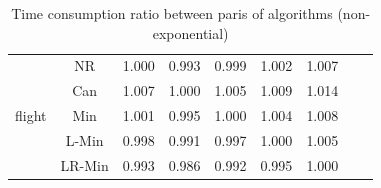 \documentclass[11pt]{book}
\begin{document}
\begin{table}
\begin{tabular}{|c|c|c|c|c|c|c|c|c|}
    \hline
    \multirow{5}{*}{flight}
         & NR & 1.000 & 0.993 & 0.999 & 1.002 & 1.007 \\                                                                                                                                                             
         & Can & 1.007 & 1.000 & 1.005 & 1.009 & 1.014 \\                                                                                                                                                            
         & Min & 1.001 & 0.995 & 1.000 & 1.004 & 1.008 \\                                                                                                                                                            
         & L-Min & 0.998 & 0.991 & 0.997 & 1.000 & 1.005 \\                                                                                                                                                          
         & LR-Min & 0.993 & 0.986 & 0.992 & 0.995 & 1.000 \\          
              	
    \hline

    
\end{tabular}

	\caption{Time consumption ratio between paris of algorithms (non-exponential)}

\end{table}
\end{document}
